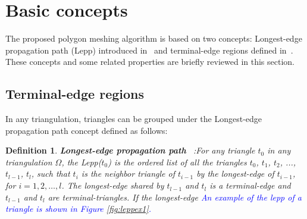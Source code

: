 \documentclass[pdflatex,sn-mathphys]{sn-jnl}%
\theoremstyle{thmstyleone}%
\theoremstyle{thmstyletwo}%
\theoremstyle{thmstylethree}%
\newtheorem{definition}{Definition}%
\begin{document}
\section{Basic concepts}
\label{sec:basic}


The proposed polygon meshing algorithm is based on two concepts: Longest-edge propagation path (Lepp) introduced in~\cite{Rivara97} and terminal-edge regions defined in~\cite{Ascom209}. These concepts and some related properties are briefly reviewed in this section.

\subsection{Terminal-edge regions}

In any triangulation, triangles can be grouped under the Longest-edge propagation path concept defined as follows:



\begin{definition}{\textbf{Longest-edge propagation path }~\cite{Rivara97}:}\label{d:lepp}  
For any triangle $t_0$ in any triangulation $\Omega$, the Lepp($t_0$)
is the ordered list of all the triangles $t_0$, $t_1$, $t_2$, ..., $t_{l-1}$, $t_{l}$, such that $t_{i}$ is the neighbor triangle of $t_{i-1}$  by the longest-edge of $t_{i-1}$, for $i = 1,2,\dots,l$. The longest-edge shared by $t_{l-1}$ and $t_l$ is a terminal-edge and $t_{l-1}$ and  $t_l$ are terminal-triangles. If the longest-edge   \textcolor{blue}{An example of the lepp of a triangle is shown in Figure \ref{fig:leppex1}.}
\end{definition}
\end{document}
